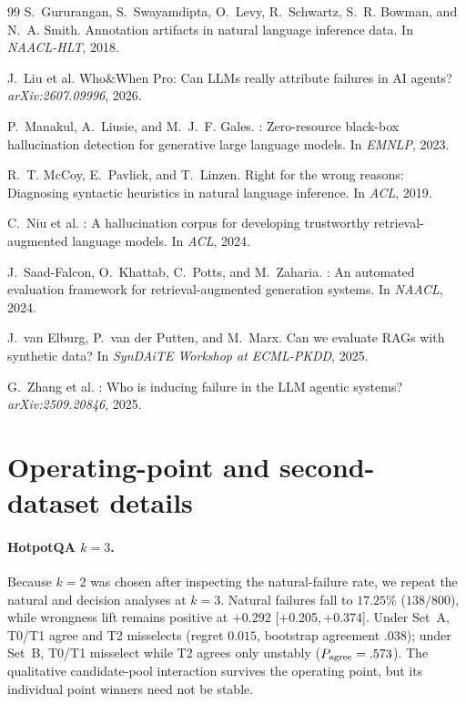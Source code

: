 \documentclass{article}
\newcommand{\ci}[2]{{\footnotesize[#1,\,#2]}}
\begin{document}
\begin{thebibliography}{99}
S.~Gururangan, S.~Swayamdipta, O.~Levy, R.~Schwartz, S.~R. Bowman, and N.~A. Smith.
\newblock Annotation artifacts in natural language inference data.
\newblock In \emph{NAACL-HLT}, 2018.

J.~Liu et al.
\newblock Who\&{W}hen {P}ro: Can {LLM}s really attribute failures in {AI} agents?
\newblock \emph{arXiv:2607.09996}, 2026.

P.~Manakul, A.~Liusie, and M.~J.~F. Gales.
: Zero-resource black-box hallucination detection for generative large language models.
\newblock In \emph{EMNLP}, 2023.

R.~T. McCoy, E.~Pavlick, and T.~Linzen.
\newblock Right for the wrong reasons: Diagnosing syntactic heuristics in natural language inference.
\newblock In \emph{ACL}, 2019.

C.~Niu et al.
: A hallucination corpus for developing trustworthy retrieval-augmented language models.
\newblock In \emph{ACL}, 2024.

J.~Saad-Falcon, O.~Khattab, C.~Potts, and M.~Zaharia.
: An automated evaluation framework for retrieval-augmented generation systems.
\newblock In \emph{NAACL}, 2024.

J.~van Elburg, P.~van der Putten, and M.~Marx.
\newblock Can we evaluate {RAG}s with synthetic data?
\newblock In \emph{SynDAiTE Workshop at ECML-PKDD}, 2025.

G.~Zhang et al.
: Who is inducing failure in the {LLM} agentic systems?
\newblock \emph{arXiv:2509.20846}, 2025.

\end{thebibliography}

\appendix

\section{Operating-point and second-dataset details}
\label{app:k3}

\paragraph{HotpotQA $k{=}3$.} Because $k{=}2$ was chosen after inspecting the natural-failure
rate, we repeat the natural and decision analyses at $k{=}3$. Natural failures fall to
$17.25\%$ ($138/800$), while wrongness lift remains positive at $+0.292$
\ci{+0.205}{+0.374}. Under Set~A, T0/T1 agree and T2 misselects (regret $0.015$, bootstrap
agreement $.038$); under Set~B, T0/T1 misselect while T2 agrees only unstably
($P_{\rm agree}=.573$). The qualitative candidate-pool interaction survives the operating
point, but its individual point winners need not be stable.
\end{document}
